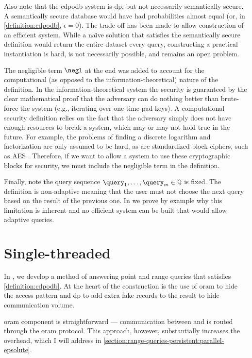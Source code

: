 		Also note that the \acrshort{cdpodb} system is \acrshort{dp}, but not necessarily semantically secure.
		A semantically secure database would have had probabilities almost equal (or, in \cref{definition:cdpodb}, $\epsilon = 0$).
		The trade-off has been made to allow construction of an efficient system.
		While a na\"{\i}ve solution that satisfies the semantically secure definition would return the entire dataset every query, constructing a practical instantiation is hard, is not necessarily possible, and remains an open problem.

		The negligible term $\negl$ at the end was added to account for the computational (as opposed to the information-theoretical) nature of the definition.
		In the information-theoretical system the security is guaranteed by the clear mathematical proof that the adversary can do nothing better than brute-force the system (e.g., iterating over one-time-pad keys).
		A computational security definition relies on the fact that the adversary simply does not have enough resources to break a system, which may or may not hold true in the future.
		For example, the problems of finding a discrete logarithm and factorization are only assumed to be hard, as are standardized block ciphers, such as AES \cite{aes-nist}.
		Therefore, if we want to allow a system to use these cryptographic blocks for security, we must include the negligible term in the definition.

		Finally, note the query sequence $\fromNtoM{\query}{1}{m} \in \querySet$ is fixed.
		The definition is non-adaptive meaning that the user \user{} must not choose the next query based on the result of the previous one.
		In \cite[Section 3.1.1]{epsolute} we prove by example why this limitation is inherent and no efficient system can be built that would allow adaptive queries.

	\section{Single-threaded \epsolute{}}

		In \epsolute{} \cite{epsolute}, we develop a method of answering point and range queries that satisfies \cref{definition:cdpodb}.
		At the heart of the construction is the use of \acrshort{oram} to hide the access pattern and \acrshort{dp} to add extra fake records to the result to hide communication volume.

		\acrshort{oram} component is straightforward --- communication between \user{} and \server{} is routed through the \acrshort{oram} protocol.
		This approach, however, substantially increases the overhead, which I will address in \cref{section:range-queries-persistent:parallel-epsolute}.

